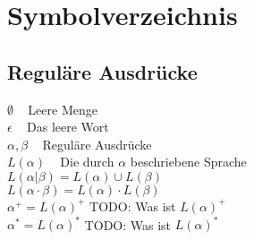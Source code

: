 \twocolumn
\chapter*{Symbolverzeichnis}
\section*{Reguläre Ausdrücke}
$\emptyset\;\;\;$ Leere Menge\\
$\epsilon\;\;\;$ Das leere Wort\\
$\alpha, \beta\;\;\;$ Reguläre Ausdrücke\\
$L(\alpha)\;\;\;$ Die durch $\alpha$ beschriebene Sprache\\
$L(\alpha | \beta) = L(\alpha) \cup L(\beta)$\\
$L(\alpha \cdot \beta) = L(\alpha) \cdot L(\beta)$\\
$\alpha^+ = L(\alpha)^+$ TODO: Was ist $L(\alpha)^+$\\
$\alpha^* = L(\alpha)^*$ TODO: Was ist $L(\alpha)^*$\\
\onecolumn